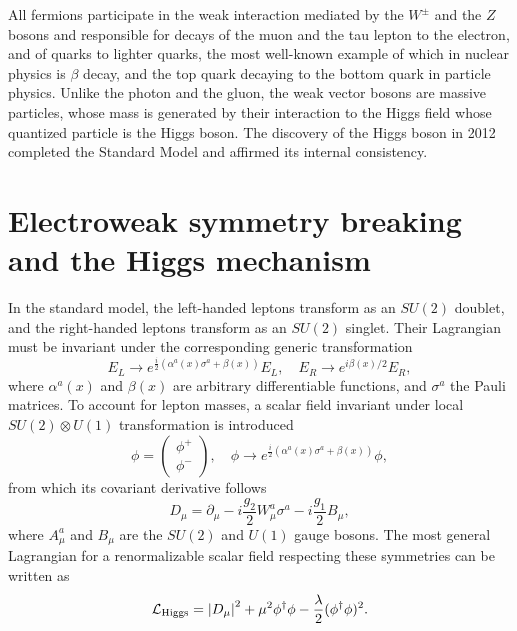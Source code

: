 All fermions participate in the weak interaction mediated by the $W^{\pm}$ and the $Z$ bosons and responsible for decays of the muon and the tau lepton to the electron, and of quarks to lighter quarks, the most well-known example of which in nuclear physics is $\beta$ decay, and the top quark decaying to the bottom quark in particle physics. 
Unlike the photon and the gluon, the weak vector bosons are massive particles, whose mass is generated by their interaction to the Higgs field whose quantized particle is the Higgs boson. 
The discovery of the Higgs boson in 2012 completed the Standard Model and affirmed its internal consistency. 

\section{Electroweak symmetry breaking and the Higgs mechanism} \label{sect:Higgs-mechanism}
In the standard model, the left-handed leptons transform as an $SU(2)$ doublet, and the right-handed leptons transform as an $SU(2)$ singlet. Their Lagrangian must be invariant under the corresponding generic transformation
\begin{equation}
    \label{eq:2.1}
    E_L \rightarrow e^{\frac{i}{2}\left( \alpha^a(x)\sigma^a + \beta(x) \right)}E_L, \quad E_R\rightarrow e^{i\beta(x)/2}E_R,
\end{equation}
where $\alpha^a(x)$ and $\beta(x)$ are arbitrary differentiable functions, and $\sigma^a$ the Pauli matrices. To account for lepton masses, a scalar field invariant under local $SU(2)\otimes U(1)$ transformation is introduced
\begin{equation}
    \label{eq:2.2}
    \phi=\begin{pmatrix}
        \phi^+ \\ \phi^-
    \end{pmatrix}, \quad \phi\rightarrow e^{\frac{i}{2}\left( \alpha^a(x)\sigma^a + \beta(x) \right)} \phi,
\end{equation}
from which its covariant derivative follows
\begin{equation}
    \label{eq:2.3}
    D_{\mu} = \partial_{\mu} - i \frac{g_2}{2}W^a_{\mu} \sigma^a - i\frac{g_1}{2}B_{\mu},
\end{equation}
where $A^{a}_{\mu}$ and $B_{\mu}$ are the $SU(2)$ and $U(1)$ gauge bosons. The most general Lagrangian for a renormalizable scalar field respecting these symmetries can be written as
\begin{equation}
    \label{eq:2.4}
    \mathcal{L}_{\mathrm{Higgs}} = \abs{D_{\mu}}^2 + \mu^2\phi^{\dagger}\phi - \frac{\lambda}{2} (\phi^{\dagger}\phi)^2.
\end{equation}
